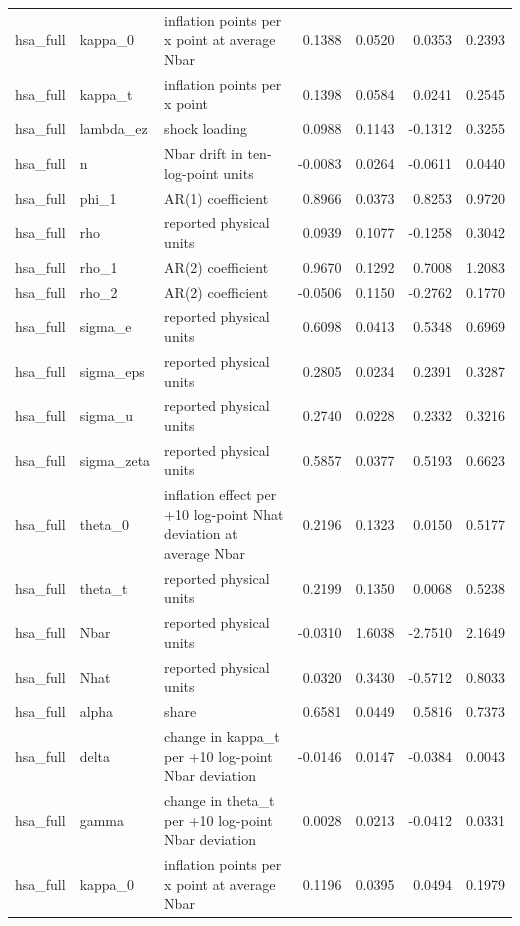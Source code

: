 \begin{tabular}{lllrrrr}
hsa\_full & kappa\_0 & inflation points per x point at average Nbar & 0.1388 & 0.0520 & 0.0353 & 0.2393 \\
hsa\_full & kappa\_t & inflation points per x point & 0.1398 & 0.0584 & 0.0241 & 0.2545 \\
hsa\_full & lambda\_ez & shock loading & 0.0988 & 0.1143 & -0.1312 & 0.3255 \\
hsa\_full & n & Nbar drift in ten-log-point units & -0.0083 & 0.0264 & -0.0611 & 0.0440 \\
hsa\_full & phi\_1 & AR(1) coefficient & 0.8966 & 0.0373 & 0.8253 & 0.9720 \\
hsa\_full & rho & reported physical units & 0.0939 & 0.1077 & -0.1258 & 0.3042 \\
hsa\_full & rho\_1 & AR(2) coefficient & 0.9670 & 0.1292 & 0.7008 & 1.2083 \\
hsa\_full & rho\_2 & AR(2) coefficient & -0.0506 & 0.1150 & -0.2762 & 0.1770 \\
hsa\_full & sigma\_e & reported physical units & 0.6098 & 0.0413 & 0.5348 & 0.6969 \\
hsa\_full & sigma\_eps & reported physical units & 0.2805 & 0.0234 & 0.2391 & 0.3287 \\
hsa\_full & sigma\_u & reported physical units & 0.2740 & 0.0228 & 0.2332 & 0.3216 \\
hsa\_full & sigma\_zeta & reported physical units & 0.5857 & 0.0377 & 0.5193 & 0.6623 \\
hsa\_full & theta\_0 & inflation effect per +10 log-point Nhat deviation at average Nbar & 0.2196 & 0.1323 & 0.0150 & 0.5177 \\
hsa\_full & theta\_t & reported physical units & 0.2199 & 0.1350 & 0.0068 & 0.5238 \\
hsa\_full & Nbar & reported physical units & -0.0310 & 1.6038 & -2.7510 & 2.1649 \\
hsa\_full & Nhat & reported physical units & 0.0320 & 0.3430 & -0.5712 & 0.8033 \\
hsa\_full & alpha & share & 0.6581 & 0.0449 & 0.5816 & 0.7373 \\
hsa\_full & delta & change in kappa\_t per +10 log-point Nbar deviation & -0.0146 & 0.0147 & -0.0384 & 0.0043 \\
hsa\_full & gamma & change in theta\_t per +10 log-point Nbar deviation & 0.0028 & 0.0213 & -0.0412 & 0.0331 \\
hsa\_full & kappa\_0 & inflation points per x point at average Nbar & 0.1196 & 0.0395 & 0.0494 & 0.1979 \\

\end{tabular}
